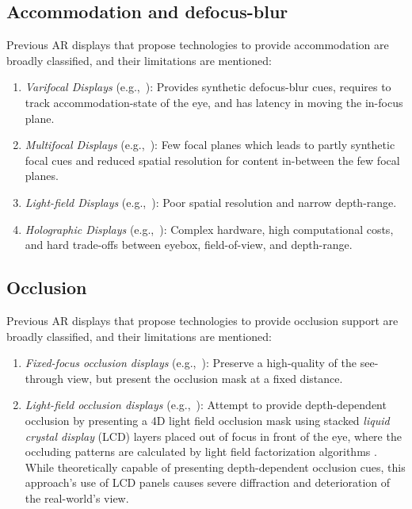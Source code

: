 \subsection{Accommodation and defocus-blur}

Previous AR displays that propose technologies to provide accommodation are broadly classified, and their limitations are mentioned:

\begin{enumerate}
    \item \emph{Varifocal Displays} (e.g.,~\citet{Konrad2016Novel,Padmanaban2016Optimizing,Dunn2017Wide,Aksit2017Near}): Provides synthetic defocus-blur cues, requires to track accommodation-state of the eye, and has latency in moving the in-focus plane.
    \item \emph{Multifocal Displays} (e.g.,~\citet{Akeley2004,Narain2015optimal}): Few focal planes which leads to partly synthetic focal cues and reduced spatial resolution for content in-between the few focal planes.
    \item \emph{Light-field Displays} (e.g.,~\citet{Lanman2013near,Maimone2014Pinlight,Huang2015Light}): Poor spatial resolution and narrow depth-range. 
    \item \emph{Holographic Displays} (e.g.,~\citet{Maimone2017Holographic,Shi2017Near}): Complex hardware, high computational costs, and hard trade-offs between eyebox, field-of-view, and depth-range. 
\end{enumerate}

\subsection{Occlusion}
Previous AR displays that propose technologies to provide occlusion support are broadly classified, and their limitations are mentioned:
\begin{enumerate}
    \item \emph{Fixed-focus occlusion displays} (e.g.,~\citet{Kiyokawa2000,Kiyokawa2001,Kiyokawa2003}): Preserve a high-quality of the see-through view, but present the occlusion mask at a fixed distance. 
    \item \emph{Light-field occlusion displays} (e.g.,~\citet{maimone2013computational}): Attempt to provide depth-dependent occlusion by presenting a 4D light field occlusion mask using stacked \emph{liquid crystal display} (LCD) layers placed out of focus in front of the eye, where the occluding patterns are calculated by light field factorization algorithms \cite{Lanman2010,Wetzstein2012}. While theoretically capable of presenting depth-dependent occlusion cues, this approach’s use of LCD panels causes severe diffraction and deterioration of the real-world’s view. 
\end{enumerate}

